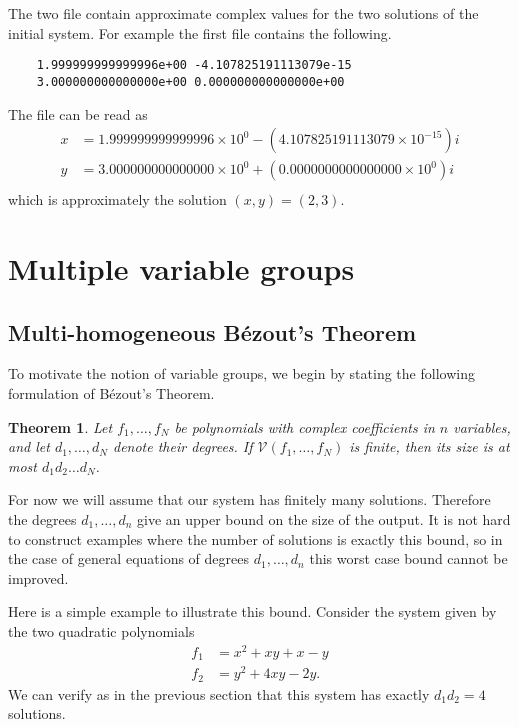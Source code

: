 \documentclass[12pt]{article}
\newtheorem{theorem}{Theorem}[section]
\theoremstyle{definition}
\begin{document}
The two file contain approximate complex values for the two solutions of 
the initial system. For example the first file contains the following.


\begin{leftbar}
\vspace{-10pt} 
\begin{verbatim}
    1.999999999999996e+00 -4.107825191113079e-15
    3.000000000000000e+00 0.000000000000000e+00
\end{verbatim}\vspace{-10pt} 
\end{leftbar}

\noindent The file can be read as
\begin{align*}
    x &= 1.999999999999996 \times 10^0 - (4.107825191113079 \times 
    10^{-15})i\\
    y &= 3.000000000000000 \times 10^0 + (0.0000000000000000 \times 
    10^{0})i\\
\end{align*}
which is approximately the solution $(x,y) = (2, 3)$.


\section{Multiple variable groups}
\subsection{Multi-homogeneous B\'{e}zout's Theorem}
To motivate the notion of variable groups, we begin by stating the 
following formulation of B\'{e}zout's Theorem.

\begin{theorem}
Let $f_1, \ldots, f_N$ be polynomials with complex coefficients in $n$ 
variables, and let $d_1, \ldots, d_N$ denote their degrees. If 
$\mathcal{V}(f_1, \ldots, f_N)$ is finite, then its size is at most 
$d_1d_2 \ldots d_N$. 
\end{theorem}

For now we will assume that our system has finitely many solutions.
Therefore the degrees $d_1, \ldots, d_n$ give an upper bound on the size 
of the output. It is not hard to construct examples where the number of 
solutions is exactly this bound, so in the case of general equations of 
degrees $d_1, \ldots, d_n$ this worst case bound cannot be improved.

Here is a simple example to illustrate this bound.
Consider the system given by the two quadratic polynomials
\begin{align*}
    f_1 &= x^2 + xy + x - y\\
    f_2 &= y^2 + 4xy - 2y.
\end{align*}
We can verify as in the previous section that this system has exactly 
$d_1d_2 = 4$ solutions.
\end{document}
